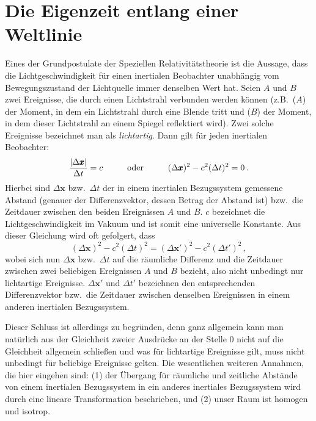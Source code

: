 \section{Die Eigenzeit entlang einer Weltlinie}

Eines der Grundpostulate der Speziellen Relativit\"atstheorie ist die Aussage, dass die
Lichtgeschwindigkeit f\"ur einen inertialen Beobachter unabh\"angig vom Bewegungszustand
der Lichtquelle immer denselben Wert hat.
 Seien $A$ und $B$ zwei Ereignisse, die durch
einen Lichtstrahl verbunden werden k\"onnen (z.B.\ ($A$) der Moment, in dem ein Lichtstrahl durch eine
Blende tritt und ($B$) der Moment, in dem dieser Lichtstrahl an einem Spiegel reflektiert wird). 
Zwei solche Ereignisse bezeichnet man als \textit{lichtartig}. 
Dann gilt f\"ur jeden inertialen Beobachter:
\begin{equation} 
             \frac{|\Delta \pmb{x}|}{\Delta t}=c   \hspace{1cm} {\rm oder} 
             \hspace{1cm} (\Delta \pmb{x})^2 - c^2 (\Delta t)^2 =0 \, .
\end{equation}
Hierbei sind $\Delta \pmb{x}$ bzw.\ $\Delta t$ der in einem inertialen Bezugssystem gemessene
Abstand (genauer der Differenzvektor, dessen Betrag der Abstand ist) bzw.\ die Zeitdauer 
zwischen den beiden Ereignissen $A$ und $B$. $c$ bezeichnet die
Lichtgeschwindigkeit im Vakuum und ist somit eine universelle Konstante. Aus dieser
Gleichung wird oft gefolgert, dass
\begin{equation} 
\label{eq_Invarianz1}
            (\Delta \pmb{x})^2 - c^2 (\Delta t)^2 = (\Delta \pmb{x}')^2 - c^2 (\Delta t')^2  \, ,
\end{equation}
wobei sich nun $\Delta \pmb{x}$ bzw.\ $\Delta t$ auf die r\"aumliche Differenz und die Zeitdauer 
zwischen zwei beliebigen Ereignissen $A$ und $B$ bezieht, also nicht unbedingt nur lichtartige 
Ereignisse. $\Delta \pmb{x}'$ und $\Delta t'$ bezeichnen den entsprechenden
Differenzvektor bzw.\ die Zeitdauer zwischen denselben Ereignissen 
in einem anderen inertialen Bezugssystem.

Dieser Schluss ist allerdings zu begr\"unden, denn ganz allgemein
kann man nat\"urlich aus der Gleichheit zweier Ausdr\"ucke an der Stelle 0 nicht auf die Gleichheit
allgemein schlie\ss en und was f\"ur lichtartige Ereignisse gilt, muss
nicht unbedingt f\"ur beliebige Ereignisse gelten. Die wesentlichen weiteren Annahmen, die hier
eingehen sind: (1) der \"Ubergang f\"ur r\"aumliche und zeitliche Abst\"ande von einem inertialen
Bezugssystem in ein anderes inertiales Bezugssystem wird durch eine lineare Transformation
beschrieben, und (2) unser Raum ist homogen und 
isotrop. 

